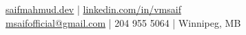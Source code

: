  {
  \href{https://saifmahmud.dev}{saifmahmud.dev} | \href{https://www.linkedin.com/in/vmsaif/}{linkedin.com/in/vmsaif}\\
  \href{mailto:msaifofficial@gmail.com}{msaifofficial@gmail.com} | 204 955 5064 | Winnipeg, MB
}